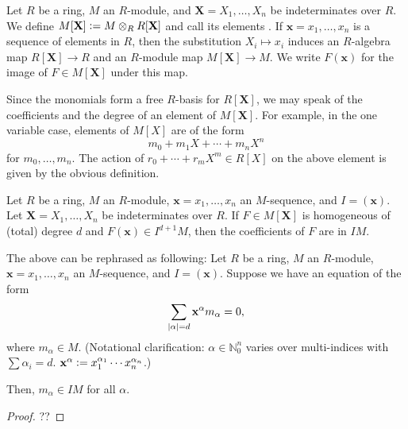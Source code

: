 \documentclass[12pt]{article}
\begin{document}
Let $R$ be a ring, $M$ an $R$-module, and $\mathbf{X} = X_{1}, \ldots, X_{n}$ be indeterminates over $R$. We define $M[\mathbf{X}] \vcentcolon= M \otimes_{R} R[\mathbf{X}]$ and call its elements . \newline
If $\mathbf{x} = x_{1}, \ldots, x_{n}$ is a sequence of elements in $R$, then the substitution $X_{i} \mapsto x_{i}$ induces an $R$-algebra map $R[\mathbf{X}] \to R$ and an $R$-module map $M[\mathbf{X}] \to M$. We write $F(\mathbf{x})$ for the image of $F \in M[\mathbf{X}]$ under this map.

Since the monomials form a free $R$-basis for $R[\mathbf{X}]$, we may speak of the coefficients and the degree of an element of $M[\mathbf{X}]$. For example, in the one variable case, elements of $M[X]$ are of the form
\begin{equation*} 
	m_{0} + m_{1} X + \cdots + m_{n} X^{n}
\end{equation*}
for $m_{0}, \ldots, m_{n}$. The action of $r_{0} + \cdots + r_{m} X^{m} \in R[X]$ on the above element is given by the obvious definition.

\begin{thm}[Rees] \label{thm:rees-regular-sequence}
	Let $R$ be a ring, $M$ an $R$-module, $\mathbf{x} = x_{1}, \ldots, x_{n}$ an $M$-sequence, and $I = (\mathbf{x})$. Let $\mathbf{X} = X_{1}, \ldots, X_{n}$ be indeterminates over $R$. If $F \in M[\mathbf{X}]$ is homogeneous of (total) degree $d$ and $F(\mathbf{x}) \in I^{d + 1} M$, then the coefficients of $F$ are in $I M$.
\end{thm}

\begin{rem}
	The above can be rephrased as following: Let $R$ be a ring, $M$ an $R$-module, $\mathbf{x} = x_{1}, \ldots, x_{n}$ an $M$-sequence, and $I = (\mathbf{x})$. Suppose we have an equation of the form
	\begin{equation*} 
		\sum_{{\left\lvert \alpha \right\lvert} = d} \mathbf{x}^{\alpha} m_{\alpha} = 0,
	\end{equation*}
	where $m_{\alpha} \in M$. (Notational clarification: $\alpha \in \mathbb{N}_{0}^{n}$ varies over multi-indices with $\sum \alpha_{i} = d$. $\mathbf{x}^{\alpha} \vcentcolon= x_{1}^{\alpha_{1}} \cdots x_{n}^{\alpha_{n}}$.) 

	Then, $m_{\alpha} \in IM$ for all $\alpha$.
\end{rem}

\begin{proof} 
	??
\end{proof}
\end{document}
